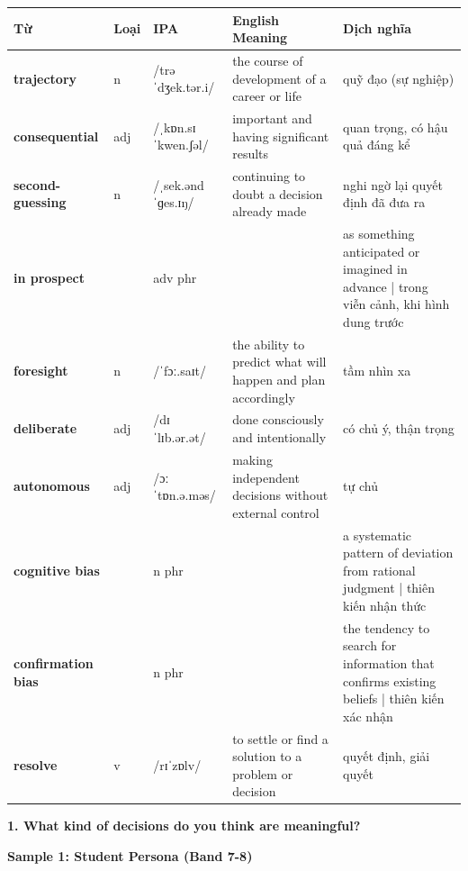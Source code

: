 \vspace{0.8em}
\begin{center}
\renewcommand{\arraystretch}{1.65}
\begin{tabularx}{\textwidth}{|V{0.22\textwidth}|C{0.07\textwidth}|I{0.20\textwidth}|Y|V{0.18\textwidth}|}
\hline
{}
\textbf{Từ} & \textbf{Loại} & \textbf{IPA} & \textbf{English Meaning} & \textbf{Dịch nghĩa} \\
\hline
\textbf{trajectory} & n & /trəˈdʒek.tər.i/ & the course of development of a career or life & quỹ đạo (sự nghiệp) \\ \hline
\textbf{consequential} & adj & /ˌkɒn.sɪˈkwen.ʃəl/ & important and having significant results & quan trọng, có hậu quả đáng kể \\ \hline
\textbf{second-guessing} & n & /ˌsek.əndˈɡes.ɪŋ/ & continuing to doubt a decision already made & nghi ngờ lại quyết định đã đưa ra \\ \hline
\textbf{in prospect} & & adv phr & & as something anticipated or imagined in advance | trong viễn cảnh, khi hình dung trước \\ \hline
\textbf{foresight} & n & /ˈfɔː.saɪt/ & the ability to predict what will happen and plan accordingly & tầm nhìn xa \\ \hline
\textbf{deliberate} & adj & /dɪˈlɪb.ər.ət/ & done consciously and intentionally & có chủ ý, thận trọng \\ \hline
\textbf{autonomous} & adj & /ɔːˈtɒn.ə.məs/ & making independent decisions without external control & tự chủ \\ \hline
\textbf{cognitive bias} & & n phr & & a systematic pattern of deviation from rational judgment | thiên kiến nhận thức \\ \hline
\textbf{confirmation bias} & & n phr & & the tendency to search for information that confirms existing beliefs | thiên kiến xác nhận \\ \hline
\textbf{resolve} & v & /rɪˈzɒlv/ & to settle or find a solution to a problem or decision & quyết định, giải quyết \\ \hline
\end{tabularx}
\end{center}

\partthreeheader

\begin{ieltsquestion}
\textbf{1. What kind of decisions do you think are meaningful?}
\end{ieltsquestion}
\textbf{Sample 1: Student Persona (Band 7-8)}

